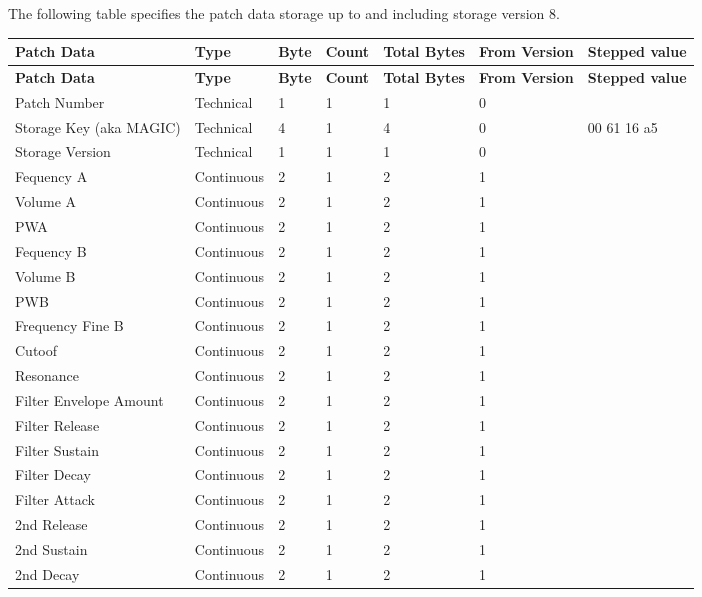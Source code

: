 The following table specifies the patch data storage up to and including storage version 8. 

\footnotesize
\renewcommand{\arraystretch}{1.3}

\begin{longtable}[l]{p{5cm}|p{2cm}|p{1.5cm}|p{1.5cm}|p{2cm}|p{2.2cm}|p{5cm}} 
\textbf{Patch Data} & \textbf{Type} & \textbf{Byte} & \textbf{Count} & \textbf{Total Bytes} & \textbf{From Version} & \textbf{Stepped value} \\ \hline
\endfirsthead
\textbf{Patch Data} & \textbf{Type} & \textbf{Byte} & \textbf{Count} & \textbf{Total Bytes} & \textbf{From Version} & \textbf{Stepped value} \\ \hline
\endhead 

Patch Number & Technical & 1 & 1 & 1 & 0 &  \\ \hline
Storage Key (aka MAGIC) & Technical & 4 & 1 & 4 & 0 & 00 61 16 a5 \\ \hline
Storage Version & Technical & 1 & 1 & 1 & 0 &  \\ \hline
Fequency A & Continuous & 2 & 1 & 2 & 1 &  \\ \hline
Volume A & Continuous & 2 & 1 & 2 & 1 &  \\ \hline
PWA & Continuous & 2 & 1 & 2 & 1 &  \\ \hline
Fequency B & Continuous & 2 & 1 & 2 & 1 &  \\ \hline
Volume B & Continuous & 2 & 1 & 2 & 1 &  \\ \hline
PWB & Continuous & 2 & 1 & 2 & 1 &  \\ \hline
Frequency Fine B & Continuous & 2 & 1 & 2 & 1 &  \\ \hline
Cutoof & Continuous & 2 & 1 & 2 & 1 &  \\ \hline
Resonance & Continuous & 2 & 1 & 2 & 1 &  \\ \hline
Filter Envelope Amount & Continuous & 2 & 1 & 2 & 1 &  \\ \hline
Filter Release & Continuous & 2 & 1 & 2 & 1 &  \\ \hline
Filter Sustain & Continuous & 2 & 1 & 2 & 1 &  \\ \hline
Filter Decay & Continuous & 2 & 1 & 2 & 1 &  \\ \hline
Filter Attack & Continuous & 2 & 1 & 2 & 1 &  \\ \hline
2nd Release & Continuous & 2 & 1 & 2 & 1 &  \\ \hline
2nd Sustain & Continuous & 2 & 1 & 2 & 1 &  \\ \hline
2nd Decay & Continuous & 2 & 1 & 2 & 1 &  \\ \hline

\end{longtable}
